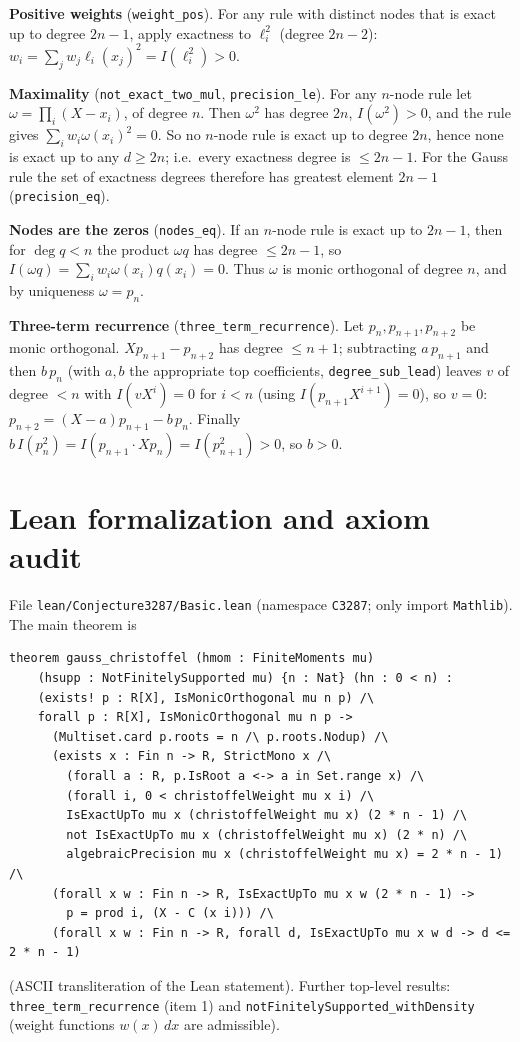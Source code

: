 \documentclass[11pt]{article}
\theoremstyle{definition}
\begin{document}
\textbf{Positive weights} (\texttt{weight\_pos}). For any rule with distinct nodes that is exact up
to degree $2n-1$, apply exactness to $\ell_i^2$ (degree $2n-2$): $w_i=\sum_j w_j\ell_i(x_j)^2=
I(\ell_i^2)>0$.

\textbf{Maximality} (\texttt{not\_exact\_two\_mul}, \texttt{precision\_le}). For any $n$-node rule
let $\omega=\prod_i(X-x_i)$, of degree $n$. Then $\omega^2$ has degree $2n$,
$I(\omega^2)>0$, and the rule gives $\sum_i w_i\omega(x_i)^2=0$. So no $n$-node rule is exact up to
degree $2n$, hence none is exact up to any $d\ge 2n$; i.e.\ every exactness degree is $\le 2n-1$.
For the Gauss rule the set of exactness degrees therefore has greatest element $2n-1$
(\texttt{precision\_eq}).

\textbf{Nodes are the zeros} (\texttt{nodes\_eq}). If an $n$-node rule is exact up to $2n-1$, then
for $\deg q<n$ the product $\omega q$ has degree $\le 2n-1$, so $I(\omega q)=\sum_i
w_i\omega(x_i)q(x_i)=0$. Thus $\omega$ is monic orthogonal of degree $n$, and by uniqueness
$\omega=p_n$.

\textbf{Three-term recurrence} (\texttt{three\_term\_recurrence}). Let $p_n,p_{n+1},p_{n+2}$ be
monic orthogonal. $Xp_{n+1}-p_{n+2}$ has degree $\le n+1$; subtracting $a\,p_{n+1}$ and then
$b\,p_n$ (with $a,b$ the appropriate top coefficients, \texttt{degree\_sub\_lead}) leaves
$v$ of degree $<n$ with $I(vX^i)=0$ for $i<n$ (using $I(p_{n+1}X^{i+1})=0$), so $v=0$:
$p_{n+2}=(X-a)p_{n+1}-b\,p_n$. Finally $b\,I(p_n^2)=I(p_{n+1}\cdot Xp_n)=I(p_{n+1}^2)>0$, so
$b>0$.

\section{Lean formalization and axiom audit}

File \texttt{lean/Conjecture3287/Basic.lean} (namespace \texttt{C3287}; only import
\texttt{Mathlib}). The main theorem is
\begin{verbatim}
theorem gauss_christoffel (hmom : FiniteMoments mu)
    (hsupp : NotFinitelySupported mu) {n : Nat} (hn : 0 < n) :
    (exists! p : R[X], IsMonicOrthogonal mu n p) /\
    forall p : R[X], IsMonicOrthogonal mu n p ->
      (Multiset.card p.roots = n /\ p.roots.Nodup) /\
      (exists x : Fin n -> R, StrictMono x /\
        (forall a : R, p.IsRoot a <-> a in Set.range x) /\
        (forall i, 0 < christoffelWeight mu x i) /\
        IsExactUpTo mu x (christoffelWeight mu x) (2 * n - 1) /\
        not IsExactUpTo mu x (christoffelWeight mu x) (2 * n) /\
        algebraicPrecision mu x (christoffelWeight mu x) = 2 * n - 1) /\
      (forall x w : Fin n -> R, IsExactUpTo mu x w (2 * n - 1) ->
        p = prod i, (X - C (x i))) /\
      (forall x w : Fin n -> R, forall d, IsExactUpTo mu x w d -> d <= 2 * n - 1)
\end{verbatim}
(ASCII transliteration of the Lean statement). Further top-level results:
\texttt{three\_term\_recurrence} (item 1) and \texttt{notFinitelySupported\_withDensity} (weight
functions $w(x)\,dx$ are admissible).
\end{document}
